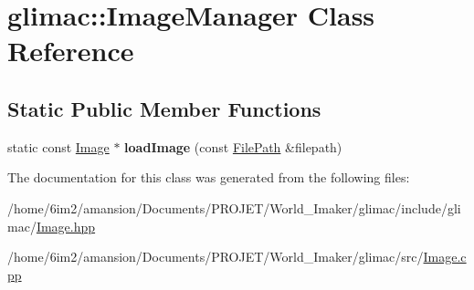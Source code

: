 \hypertarget{classglimac_1_1ImageManager}{}\section{glimac\+:\+:Image\+Manager Class Reference}
\label{classglimac_1_1ImageManager}
\subsection*{Static Public Member Functions}
\begin{DoxyCompactItemize}
\item 
\mbox{\label{classglimac_1_1ImageManager_a491965842042b2ef01eade7136ddb54d}} 
static const \hyperlink{classglimac_1_1Image}{Image} $\ast$ {\bfseries load\+Image} (const \hyperlink{classglimac_1_1FilePath}{File\+Path} \&filepath)
\end{DoxyCompactItemize}


The documentation for this class was generated from the following files\+:\begin{DoxyCompactItemize}
\item 
/home/6im2/amansion/\+Documents/\+P\+R\+O\+J\+E\+T/\+World\+\_\+\+Imaker/glimac/include/glimac/\hyperlink{Image_8hpp}{Image.\+hpp}\item 
/home/6im2/amansion/\+Documents/\+P\+R\+O\+J\+E\+T/\+World\+\_\+\+Imaker/glimac/src/\hyperlink{Image_8cpp}{Image.\+cpp}\end{DoxyCompactItemize}
